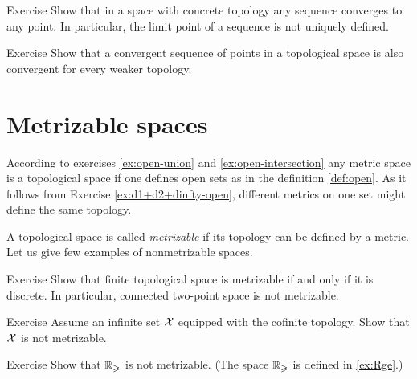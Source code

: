 \begin{thm}{Exercise}
Show that in a space with concrete topology any sequence converges to any point.
In particular, the limit point of a sequence is not uniquely defined.
\end{thm}

\begin{thm}{Exercise}
Show that a convergent sequence of points in a topological space is also convergent for every weaker topology.
\end{thm}


\section{Metrizable spaces}

According to exercises \ref{ex:open-union} and \ref{ex:open-intersection} any metric space is a topological space if one defines open sets as in the definition \ref{def:open}.
As it follows from Exercise \ref{ex:d1+d2+dinfty-open},
different metrics on one set might define the same topology.

A topological space is called \emph{metrizable} if its topology can be defined by a metric.
Let us give few examples of nonmetrizable spaces.

\begin{thm}{Exercise}\label{ex:finite+metrizable}
Show that finite topological space is metrizable if and only if it is discrete.
In particular, connected two-point space is not metrizable.
\end{thm}

\begin{thm}{Exercise}
Assume an infinite set $\mathcal{X}$ equipped with the cofinite topology.
Show that $\mathcal{X}$ is not metrizable.
\end{thm}

\begin{thm}{Exercise}
Show that $\mathbb{R}_\geqslant$ is not metrizable.
(The space $\mathbb{R}_\geqslant$ is defined in \ref{ex:Rge}.)
\end{thm}
